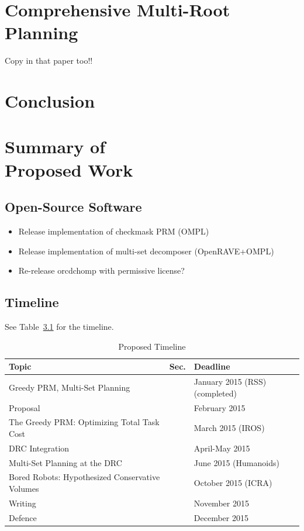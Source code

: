 \documentclass{report}
\begin{document}
\newpage
\chapter{Comprehensive Multi-Root Planning}

Copy in that paper too!!


\newpage
\chapter{Conclusion}


\newpage
\chapter[Summary of Proposed Work]{Summary of\\Proposed Work}

\section{Open-Source Software}

\begin{itemize}
\item Release implementation of checkmask PRM (OMPL)
\item Release implementation of multi-set decomposer (OpenRAVE+OMPL)
\item Re-release orcdchomp with permissive license?
\end{itemize}

\section{Timeline}

See Table~\ref{table:timeline} for the timeline.

\begin{table}
\centering
\begin{tabular}{lll}
\hline
Topic & Sec. & Deadline \\
\hline
Greedy PRM, Multi-Set Planning & & January 2015 (RSS) (completed) \\
Proposal & & February 2015 \\
The Greedy PRM: Optimizing Total Task Cost & & March 2015 (IROS) \\
DRC Integration & & April-May 2015 \\
Multi-Set Planning at the DRC & & June 2015 (Humanoids) \\
Bored Robots: Hypothesized Conservative Volumes & & October 2015 (ICRA) \\
Writing & & November 2015 \\
Defence & & December 2015 \\
\hline
\end{tabular}
\caption{Proposed Timeline}
\label{table:timeline}
\end{table}
\end{document}
